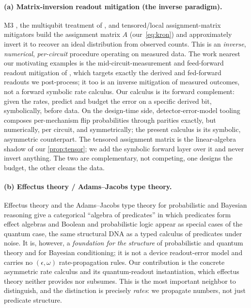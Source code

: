 \documentclass[12pt]{article}
\numberwithin{equation}{section}
\theoremstyle{plain}
\theoremstyle{definition}
\theoremstyle{remark}
\newcommand{\eps}{\epsilon}
\begin{document}
\paragraph{(a) Matrix-inversion readout mitigation (the inverse paradigm).}
M3 \citep{nation2021m3}, the multiqubit treatment of
\citet{bravyi2021mitigating}, and tensored/local assignment-matrix mitigators
build the assignment matrix $A$ (our~\eqref{eq:kron}) and approximately invert it
to recover an ideal distribution from observed counts. This is an \emph{inverse},
\emph{numerical}, \emph{per-circuit} procedure operating on measured data. The
work nearest our motivating examples is the mid-circuit-measurement and
feed-forward readout mitigation of \citet{koh2024readout}, which targets exactly
the derived and fed-forward readouts we post-process; it too is an inverse
mitigation of measured outcomes, not a forward symbolic rate calculus. Our
calculus is its forward complement: given the rates, predict and budget the error
on a specific derived bit, symbolically, before data. On the design-time side,
detector-error-model tooling \citep{gidney2021stim} composes per-mechanism flip
probabilities through parities exactly, but numerically, per circuit, and
symmetrically; the present calculus is its symbolic, asymmetric counterpart.
The tensored assignment
matrix is the linear-algebra shadow of our \cref{prop:tensor}; we add the
symbolic forward layer over it and never invert anything. The two are
complementary, not competing, one designs the budget, the other cleans the
data.

\paragraph{(b) Effectus theory / Adams--Jacobs type theory.}
Effectus theory and the Adams--Jacobs type theory for probabilistic and Bayesian
reasoning \citep{cho2015effectus,adams2015typetheory} give a categorical
``algebra of predicates'' in which predicates form effect algebras and Boolean
and probabilistic logic appear as special cases of the quantum case, the same
structural DNA as a typed calculus of predicates under noise. It is, however, a
\emph{foundation for the structure} of probabilistic and quantum theory and for
Bayesian conditioning; it is not a device readout-error model and carries no
$(\eps,\omega)$ rate-propagation rules. Our contribution is the concrete
asymmetric rate calculus and its quantum-readout instantiation, which effectus
theory neither provides nor subsumes. This is the most important neighbor to
distinguish, and the distinction is precisely \emph{rates}: we propagate numbers,
not just predicate structure.
\end{document}

